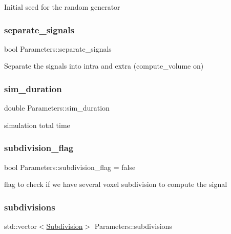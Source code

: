 Initial seed for the random generator \mbox{\label{class_parameters_adacb13afed18c07dfd269fae76f828b3}} 
\subsubsection{\texorpdfstring{separate\+\_\+signals}{separate\_signals}}
{\footnotesize\ttfamily bool Parameters\+::separate\+\_\+signals}

Separate the signals into intra and extra (compute\+\_\+volume on) \mbox{\label{class_parameters_acbe36f055786ddcf8480a49d2c34c914}} 
\subsubsection{\texorpdfstring{sim\+\_\+duration}{sim\_duration}}
{\footnotesize\ttfamily double Parameters\+::sim\+\_\+duration}

simulation total time \mbox{\label{class_parameters_a43362cb6e3ea49cc9db9e52c3ebc7140}} 
\subsubsection{\texorpdfstring{subdivision\+\_\+flag}{subdivision\_flag}}
{\footnotesize\ttfamily bool Parameters\+::subdivision\+\_\+flag = false}

flag to check if we have several voxel subdivision to compute the signal \mbox{\label{class_parameters_a3c05ff7a30f151c384b83ce3adca26fa}} 
\subsubsection{\texorpdfstring{subdivisions}{subdivisions}}
{\footnotesize\ttfamily std\+::vector$<$\hyperlink{class_subdivision}{Subdivision}$>$ Parameters\+::subdivisions}

